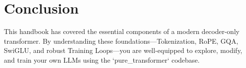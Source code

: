 \section{Conclusion}
This handbook has covered the essential components of a modern decoder-only transformer. By understanding these foundations—Tokenization, RoPE, GQA, SwiGLU, and robust Training Loops—you are well-equipped to explore, modify, and train your own LLMs using the `pure_transformer` codebase.
